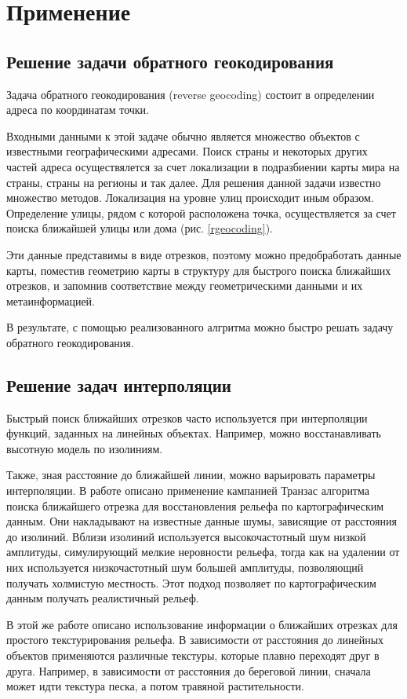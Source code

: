 \chapter{Применение}
\section{Решение задачи обратного геокодирования}
Задача обратного геокодирования (reverse geocoding) состоит в
определении адреса по координатам точки.

Входными данными к этой задаче обычно является множество объектов
с известными географическими адресами. Поиск страны и некоторых других частей
адреса осуществялется за счет локализации в подразбиении карты мира на страны, 
страны на регионы и так далее. Для решения данной задачи известно множество методов.
Локализация на уровне улиц происходит иным образом. Определение улицы, рядом с 
которой расположена точка, осуществляется за счет поиска ближайшей улицы или дома (рис. \ref{rgeocoding}).

Эти данные представимы в виде отрезков, поэтому можно предобработать данные карты,
поместив геометрию карты в структуру для быстрого поиска ближайших отрезков, и запомнив
соответствие между геометрическими данными и их метаинформацией.

В результате, с помощью реализованного алгритма можно быстро решать задачу обратного геокодирования.


\FloatBarrier
\section{Решение задач интерполяции}
Быстрый поиск ближайших отрезков часто используется при интерполяции
функций, заданных на линейных объектах. Например, можно
восстанавливать высотную модель по изолиниям.

Также, зная расстояние до ближайшей линии, можно варьировать параметры
интерполяции. В работе \cite{NGRID} описано применение кампанией Транзас алгоритма
поиска ближайшего отрезка для восстановления рельефа по
картографическим данным. Они накладывают на известные данные шумы,
зависящие от расстояния до изолиний. Вблизи изолиний используется
высокочастотный шум низкой амплитуды, симулирующий мелкие неровности
рельефа, тогда как на удалении от них используется низкочастотный шум
большей амплитуды, позволяющий получать холмистую местность. Этот
подход позволяет по картографическим данным получать реалистичный
рельеф.

В этой же работе описано использование информации о ближайших отрезках
для простого текстурирования рельефа. В зависимости от расстояния до
линейных объектов применяются различные текстуры, которые плавно
переходят друг в друга. Например, в зависимости от расстояния до
береговой линии, сначала может идти текстура песка, а потом травяной растительности.

\FloatBarrier
